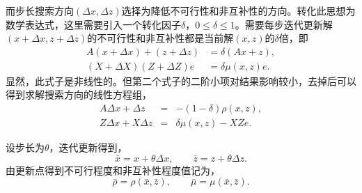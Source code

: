 \documentclass{ctexart}
\numberwithin{equation}{section} %
\begin{document}
而步长搜索方向$ \left(\Delta x, \Delta z\right) $选择为降低不可行性和非互补性的方向。转化此思想为数学表达式，这里需要引入一个转化因子$ \delta $，$ 0 \leq \delta \leq 1 $。需要每步迭代更新解$ \left(x + \Delta x, z + \Delta z\right) $的不可行性和非互补性都是当前解$ \left(x, z\right) $的$ \delta $倍，即
\begin{equation}
	\begin{aligned}
		A\left(x + \Delta x\right) + \left(z + \Delta z\right) & = \delta\left(Ax + z\right),  \\
		\left(X + \Delta X\right)\left(Z + \Delta Z\right)e & = \delta\mu\left(x, z\right)e.
	\end{aligned} \nonumber
\end{equation}
显然，此式子是非线性的。但第二个式子的二阶小项对结果影响较小，去掉后可以得到求解搜索方向的线性方程组，
\begin{eqnarray}
		A\Delta x + \Delta z & = & -\left(1 - \delta\right)\rho\left(x, z\right),  \label{Eq: infeasibleSD} \\
		Z\Delta x + X\Delta z & = & \delta\mu\left(x, z\right) - XZe. \label{Eq: noncomplementarySD}
\end{eqnarray}

设步长为$ \theta $，迭代更新得到，
\begin{equation}
	\bar{x} = x + \theta\Delta x, \qquad \bar{z} = z + \theta\Delta z.  \nonumber
\end{equation}
由更新点得到不可行程度和非互补性程度值记为，
\begin{equation}
	\bar{\rho} = \rho\left(\bar{x}, \bar{z}\right), \qquad \bar{\mu} = \mu\left(\bar{x}, \bar{z}\right).  \nonumber
\end{equation}
\end{document}
